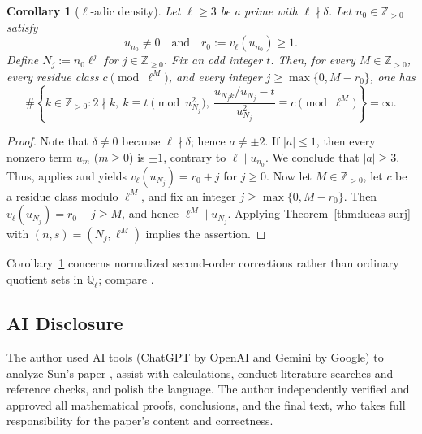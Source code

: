 \documentclass[12pt]{amsart}
\numberwithin{equation}{section}
\newtheorem{corollary}[theorem]{Corollary}
\theoremstyle{remark}
\theoremstyle{plain}
\newcommand{\Z}{\mathbb{Z}}
\newcommand{\Q}{\mathbb{Q}}
\begin{document}
\begin{corollary}[$\ell$-adic density]\label{cor:padic-density}
Let $\ell\geq3$ be a prime with $\ell\nmid\delta$. Let $n_0\in\Z_{>0}$ satisfy
\[
u_{n_0}\neq0\quad\text{and}\quad r_0:=v_\ell(u_{n_0})\geq1.
\]
Define $N_j:=n_0\ell^j$ for $j\in\Z_{\geq0}$. Fix an odd integer $t$. Then, for every $M\in\Z_{>0}$, every residue class $c\pmod{\ell^M}$, and every integer $j\geq\max\{0,M-r_0\}$, one has
\[
\#\left\lbrace k\in\Z_{>0}\colon2\nmid k,\ k\equiv t\pmod{u_{N_j}^2},\ \frac{u_{N_jk}/u_{N_j}-t}{u_{N_j}^2}\equiv c\pmod{\ell^M}\right\rbrace=\infty.
\]
\end{corollary}
\begin{proof}
Note that $\delta\neq0$ because $\ell\nmid\delta$; hence $a\neq\pm2$. If $|a|\leq1$, then every nonzero term $u_m$ ($m\geq0$) is $\pm1$, contrary to $\ell\mid u_{n_0}$. We conclude that $|a|\geq3$. Thus, \cite[Corollary~1.6]{Sanna16} applies and yields $v_\ell(u_{N_j})=r_0+j$ for $j\geq0$. Now let $M\in\Z_{>0}$, let $c$ be a residue class modulo $\ell^M$, and fix an integer $j\geq\max\{0,M-r_0\}$. Then $v_\ell(u_{N_j})=r_0+j\geq M$, and hence $\ell^M\mid u_{N_j}$. Applying Theorem~\ref{thm:lucas-surj} with $(n,s)=(N_j,\ell^M)$ implies the assertion.
\end{proof}
Corollary~\ref{cor:padic-density} concerns normalized second-order corrections rather than ordinary quotient sets in $\Q_\ell$; compare \cite{AntonyBarman23,AntonyBarman25}.

\subsection*{AI Disclosure}
The author used AI tools (ChatGPT by OpenAI and Gemini by Google) to analyze Sun's paper \cite{Sun26}, assist with calculations, conduct literature searches and reference checks, and polish the language. The author independently verified and approved all mathematical proofs, conclusions, and the final text, who takes full responsibility for the paper's content and correctness.
\end{document}

